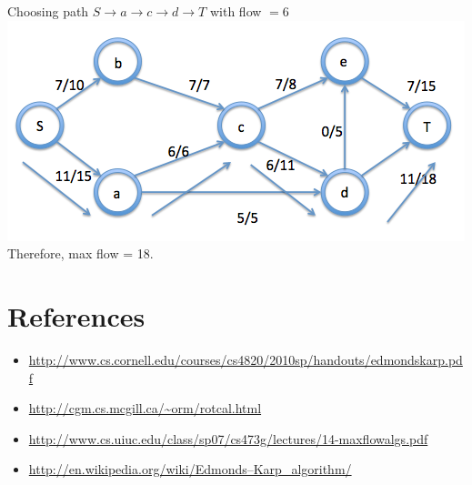 \documentclass{article}
\begin{document}
Choosing path $S \rightarrow a \rightarrow c \rightarrow  d \rightarrow T$ with flow $= 6$
\newline
\includegraphics[width=\linewidth]{images/4}
Therefore, max flow = 18.
\section{References}
\begin{itemize}
\item \url{http://www.cs.cornell.edu/courses/cs4820/2010sp/handouts/edmondskarp.pdf}
\item \url{http://cgm.cs.mcgill.ca/~orm/rotcal.html}
\item \url{http://www.cs.uiuc.edu/class/sp07/cs473g/lectures/14-maxflowalgs.pdf}
\item \url{http://en.wikipedia.org/wiki/Edmonds–Karp_algorithm/}
\end{itemize}
\end{document}
